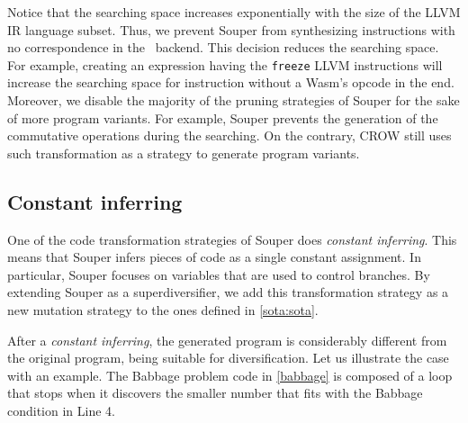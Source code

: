 Notice that the searching space increases exponentially with the size of the LLVM IR language subset. Thus,
we prevent Souper from synthesizing instructions with no correspondence in the \wasm\ backend. This decision reduces the searching space. For example, creating an expression having the  \texttt{freeze} LLVM instructions will increase the searching space for instruction without a Wasm's opcode in the end.
Moreover, we disable the majority of the pruning strategies of Souper for the sake of more program variants.
For example, Souper prevents the generation of the commutative operations during the searching.
On the contrary, CROW still uses such transformation as a strategy to generate program variants. 

\subsection{Constant inferring}

One of the code transformation strategies of Souper does \emph{constant inferring}. This means that Souper infers pieces of code as a single constant assignment. In particular, Souper focuses on variables that are used to control branches.
By extending Souper as a superdiversifier, we add this transformation strategy as a new mutation strategy to the ones defined in \autoref{sota:sota}. 


After a \emph{constant inferring}, the generated program is considerably different from the original program, being suitable for diversification.
Let us illustrate the case with an example.
The Babbage problem code in \autoref{babbage} is composed of a loop that stops when it discovers the smaller number that fits with the Babbage condition in Line 4.



